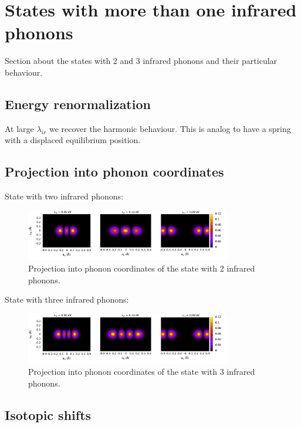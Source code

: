 \chapter{States with more than one infrared phonons}
\label{chap:more_ir}

Section about the states with 2 and 3 infrared phonons and their particular behaviour.

\section{Energy renormalization}

At large $\lambda_{ir}$ we recover the harmonic behaviour. This is analog to have a spring with a displaced equilibrium position.

\section{Projection into phonon coordinates}

State with two infrared phonons:

\begin{figure}[ht!]
\centering
\includegraphics[width=0.8\textwidth]{images/ph-second_infrared.png}
\caption{Projection into phonon coordinates of the state with 2 infrared phonons.}
\label{fig:ph-second_infrared}
\end{figure}

State with three infrared phonons:

\begin{figure}[ht!]
\centering
\includegraphics[width=0.8\textwidth]{images/ph-third_infrared.png}
\caption{Projection into phonon coordinates of the state with 3 infrared phonons.}
\label{fig:ph-third_infrared}
\end{figure}

\section{Isotopic shifts}

